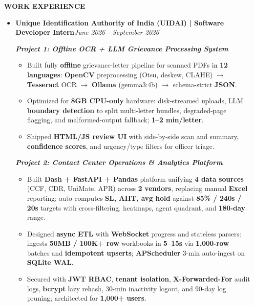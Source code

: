 \documentclass[10pt,article]{article}
\newcommand{\resheading}[1]{{\small \colorbox{mygrey}{\begin{minipage}{\textwidth}\textbf{#1 \vphantom{p\^{E}}}\end{minipage}}}}
\begin{document}
\vspace{3pt}
\noindent
\resheading{\textbf{WORK EXPERIENCE}}
\begin{itemize}[leftmargin=*]\small
\item \textbf{Unique Identification Authority of India (UIDAI) | Software Developer Intern}\hfill \textit{June 2026 - September 2026}

\vspace{2pt}
\textit{\textbf{Project 1: Offline OCR + LLM Grievance Processing System}}
\begin{itemize}[noitemsep, leftmargin=*]\footnotesize
\item Built fully \textbf{offline} grievance-letter pipeline for scanned PDFs in \textbf{12 languages}: \textbf{OpenCV} preprocessing (Otsu, deskew, CLAHE) $\rightarrow$ \textbf{Tesseract} OCR $\rightarrow$ \textbf{Ollama} (gemma3:4b) $\rightarrow$ schema-strict \textbf{JSON}.
\item Optimized for \textbf{8GB CPU-only} hardware: disk-streamed uploads, LLM \textbf{boundary detection} to split multi-letter bundles, degraded-page flagging, and malformed-output fallback; \textbf{1--2 min/letter}.
\item Shipped \textbf{HTML/JS review UI} with side-by-side scan and summary, \textbf{confidence scores}, and urgency/type filters for officer triage.
\end{itemize}

\vspace{2pt}
\textit{\textbf{Project 2: Contact Center Operations \& Analytics Platform}}
\begin{itemize}[noitemsep, leftmargin=*]\footnotesize
\item Built \textbf{Dash + FastAPI + Pandas} platform unifying \textbf{4 data sources} (CCF, CDR, UniMate, APR) across \textbf{2 vendors}, replacing manual \textbf{Excel} reporting; auto-computes \textbf{SL, AHT, avg hold} against \textbf{85\% / 240s / 20s} targets with cross-filtering, heatmaps, agent quadrant, and \textbf{180-day} range.
\item Designed \textbf{async ETL} with \textbf{WebSocket} progress and stateless parsers: ingests \textbf{50MB / 100K+ row} workbooks in \textbf{5--15s} via \textbf{1,000-row} batches and \textbf{idempotent upserts}; \textbf{APScheduler} 3-min auto-ingest on \textbf{SQLite WAL}.
\item Secured with \textbf{JWT RBAC}, \textbf{tenant isolation}, \textbf{X-Forwarded-For} audit logs, \textbf{bcrypt} lazy rehash, 30-min inactivity logout, and 90-day log pruning; architected for \textbf{1,000+ users}.
\end{itemize}
\end{itemize}
\end{document}
